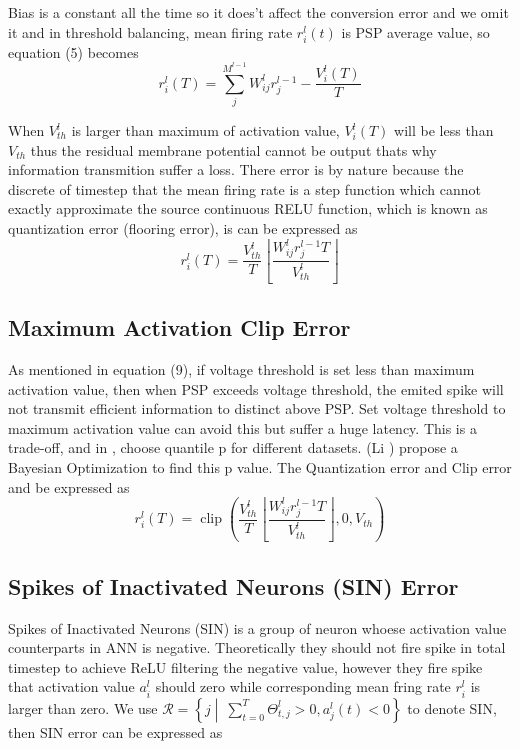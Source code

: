 \documentclass{article}
\begin{document}
Bias is a constant all the time so it does't affect the conversion error and we omit it and in threshold balancing, mean firing rate $r_i^l(t)$ is PSP average value, so equation (5) becomes
\begin{equation}
  r_i^l(T) = \sum_j^{M^{l-1}}W_{ij}^lr_j^{l-1} - \frac{V_i^l(T)}{T}
\end{equation}

When $V_{th}^l$ is larger than maximum of activation value, $V_i^l(T)$ will be less than $V_{th}$ thus the residual membrane potential cannot be output thats why information transmition suffer a loss.
There error is by nature because the discrete of timestep that the mean firing rate is a step function which cannot exactly approximate the source continuous RELU function, which is known as quantization error (flooring error), is can be expressed as
\begin{equation}
  r_i^l(T) = \frac{V_{th}^l}{T}\left\lfloor\frac{W_{ij}^lr_j^{l-1}T}{V_{th}^l}\right\rfloor
\end{equation}

\subsection{Maximum Activation Clip Error}
As mentioned in equation (9), if voltage threshold is set less than maximum activation value, then when PSP exceeds voltage threshold, the emited spike will not transmit efficient information to distinct above PSP.
Set voltage threshold to maximum activation value can avoid this but suffer a huge latency. This is a trade-off, and in \cite{rueckauer2017conversion}, choose quantile p for different datasets. (Li ) propose a Bayesian Optimization to find this p value.
The Quantization error and Clip error and be expressed as
\begin{equation}
  r_i^l(T) = \operatorname{clip}\left(\frac{V_{th}^l}{T}\left\lfloor\frac{W_{ij}^lr_j^{l-1}T}{V_{th}^l}\right\rfloor, 0, V_{th}\right)
\end{equation}


\subsection{Spikes of Inactivated Neurons (SIN) Error}
Spikes of Inactivated Neurons (SIN) is a group of neuron whoese activation value counterparts in ANN is negative. Theoretically they should not fire spike in total timestep to achieve ReLU filtering the negative value, however they fire spike that activation value $a_i^l$ should zero while corresponding 
mean fring rate $r_i^l$ is larger than zero. 
We use $\mathcal{R}=\left\{j \middle\vert\ \sum_{t=0}^T\Theta_{t,j}^l >0, a_j^l(t) < 0\right\}$ to denote SIN, then SIN error can be expressed as
\end{document}
